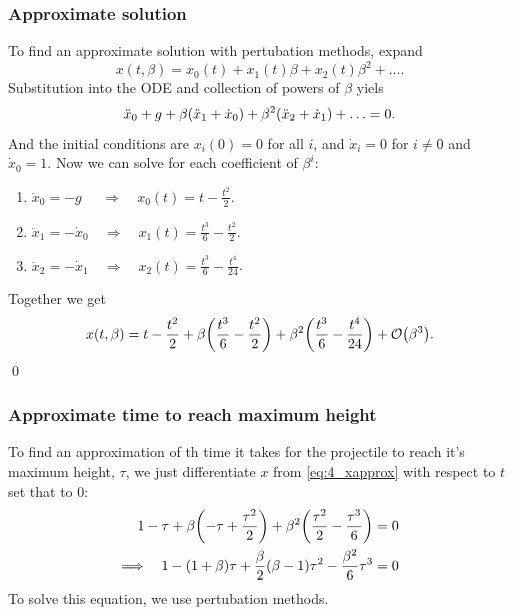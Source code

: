 \documentclass[11pt,letter, swedish, english
]{article}
\begin{document}
\subsubsection{Approximate solution}
To find an approximate solution with pertubation methods, expand
\begin{equation}
x(t, \beta) = x_0(t) + x_1(t)\beta + x_2(t)\beta^2 + \ldots.
\end{equation}
Substitution into the ODE and collection of powers of $\beta$ yiels
\begin{equation}
\ddot{x}_0+g + \beta\qty(\ddot{x}_1+\dot{x}_0) +
\beta^2\qty(\ddot{x}_2 + \dot{x}_1) + \ldots = 0.
\end{equation}
And the initial conditions are $x_i(0)=0$ for all $i$, and
$\dot{x}_i=0$ for $i\neq0$ and $\dot{x}_0=1$. Now we can solve for
each coefficient of $\beta^i$:
\vspace{-1mm}
\begin{enumerate}[label=$\order{\beta^{\arabic*}}$: , start=0, leftmargin=2cm]
\item $\displaystyle \ddot{x}_0=-g_{\phantom{0}} \quad\Longrightarrow\quad
x_0(t) = t - \frac{t^2}{2}$.
\item $\displaystyle \ddot{x}_1=-\dot{x}_0 \quad\Longrightarrow\quad
x_1(t) = \frac{t^3}{6} - \frac{t^2}{2}$.
\item $\displaystyle \ddot{x}_2=-\dot{x}_1 \quad\Longrightarrow\quad
x_2(t) = \frac{t^3}{6} - \frac{t^4}{24}$.
\end{enumerate}
Together we get\footnotemark{}
\begin{equation}\label{eq:4_xapprox}
x(t, \beta) = t - \frac{t^2}{2} + \beta\qty(\frac{t^3}{6}-\frac{t^2}{2})
 + \beta^2\qty(\frac{t^3}{6}-\frac{t^4}{24}) + \order{\beta^3}.
\end{equation}
\qed
{}

\subsubsection{Approximate time to reach maximum height}
To find an approximation of th time it takes for the projectile to
reach it's maximum height, $\tau$, we just differentiate $x$ from
\eqref{eq:4_xapprox} with respect to $t$ set that to $0$:
\begin{equation}
\begin{aligned}
1-\tau + \beta\qty(-\tau+\frac{\tau^2}{2}) 
+ \beta^2\qty(\frac{\tau^2}{2}-\frac{\tau^3}{6}) &= 0\\
\Longrightarrow\quad
1 - (1+\beta)\tau + \frac{\beta}{2}\qty(\beta -1)\tau^2 
- \frac{\beta^2}{6}\tau^3 &= 0
\end{aligned}
\end{equation}
To solve this equation, we use pertubation methods. 
\end{document}

